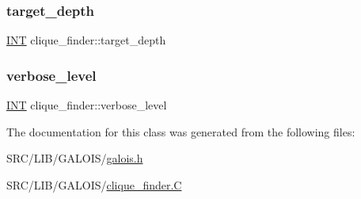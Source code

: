 \subsubsection{\texorpdfstring{target\+\_\+depth}{target\_depth}}
{\footnotesize\ttfamily \mbox{\hyperlink{galois_8h_a09fddde158a3a20bd2dcadb609de11dc}{I\+NT}} clique\+\_\+finder\+::target\+\_\+depth}

\mbox{\label{classclique__finder_a0039c6c78005df91c2f78efdc1c8156f}} 
\subsubsection{\texorpdfstring{verbose\+\_\+level}{verbose\_level}}
{\footnotesize\ttfamily \mbox{\hyperlink{galois_8h_a09fddde158a3a20bd2dcadb609de11dc}{I\+NT}} clique\+\_\+finder\+::verbose\+\_\+level}



The documentation for this class was generated from the following files\+:\begin{DoxyCompactItemize}
\item 
S\+R\+C/\+L\+I\+B/\+G\+A\+L\+O\+I\+S/\mbox{\hyperlink{galois_8h}{galois.\+h}}\item 
S\+R\+C/\+L\+I\+B/\+G\+A\+L\+O\+I\+S/\mbox{\hyperlink{clique__finder_8_c}{clique\+\_\+finder.\+C}}\end{DoxyCompactItemize}

